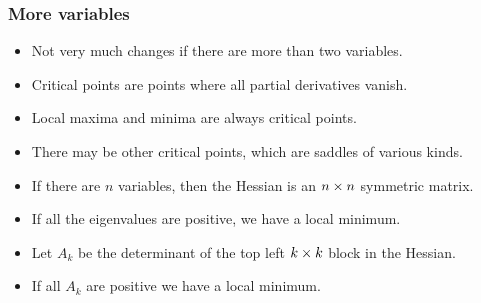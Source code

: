 \documentclass[9pt]{beamer}
\begin{document}
\begin{frame}[t]
 \frametitle{More variables}
 \begin{itemize}
  \item<1-> Not very much changes if there are more than two variables.
  \item<2-> Critical points are points where all partial derivatives vanish.
  \item<3-> Local maxima and minima are always critical points.
  \item<4-> There may be other critical points, which are saddles of
   various kinds.
  \item<5-> If there are $n$ variables, then the Hessian is an $n\times n$
   symmetric matrix.
  \item<6-> If all the eigenvalues are positive, we have a local minimum.
  \item<9-> Let $A_k$ be the determinant of the top left $k\times k$
   block in the Hessian.  
  \item<11-> If all $A_k$ are positive we have a local minimum.  
 \end{itemize}
\end{frame}
\end{document}
